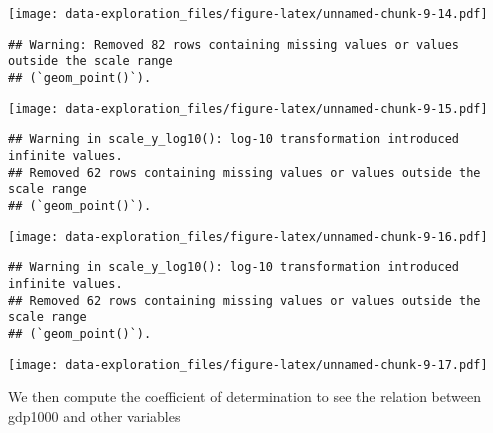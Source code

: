 \documentclass[
]{article}
\newenvironment{Shaded}{\begin{snugshade}}{\end{snugshade}}
\newcommand{\AttributeTok}[1]{\textcolor[rgb]{0.13,0.29,0.53}{#1}}
\newcommand{\CommentTok}[1]{\textcolor[rgb]{0.56,0.35,0.01}{\textit{#1}}}
\newcommand{\ControlFlowTok}[1]{\textcolor[rgb]{0.13,0.29,0.53}{\textbf{#1}}}
\newcommand{\DecValTok}[1]{\textcolor[rgb]{0.00,0.00,0.81}{#1}}
\newcommand{\FunctionTok}[1]{\textcolor[rgb]{0.13,0.29,0.53}{\textbf{#1}}}
\newcommand{\NormalTok}[1]{#1}
\newcommand{\OtherTok}[1]{\textcolor[rgb]{0.56,0.35,0.01}{#1}}
\newcommand{\SpecialCharTok}[1]{\textcolor[rgb]{0.81,0.36,0.00}{\textbf{#1}}}
\newcommand{\StringTok}[1]{\textcolor[rgb]{0.31,0.60,0.02}{#1}}
\begin{document}
\texttt{[image: data-exploration\_files/figure-latex/unnamed-chunk-9-14.pdf]}

\begin{verbatim}
## Warning: Removed 82 rows containing missing values or values outside the scale range
## (`geom_point()`).
\end{verbatim}

\texttt{[image: data-exploration\_files/figure-latex/unnamed-chunk-9-15.pdf]}

\begin{verbatim}
## Warning in scale_y_log10(): log-10 transformation introduced infinite values.
## Removed 62 rows containing missing values or values outside the scale range
## (`geom_point()`).
\end{verbatim}

\texttt{[image: data-exploration\_files/figure-latex/unnamed-chunk-9-16.pdf]}

\begin{verbatim}
## Warning in scale_y_log10(): log-10 transformation introduced infinite values.
## Removed 62 rows containing missing values or values outside the scale range
## (`geom_point()`).
\end{verbatim}

\texttt{[image: data-exploration\_files/figure-latex/unnamed-chunk-9-17.pdf]}

We then compute the coefficient of determination to see the relation
between gdp1000 and other variables

\begin{Shaded}
\end{Shaded}
\end{document}
